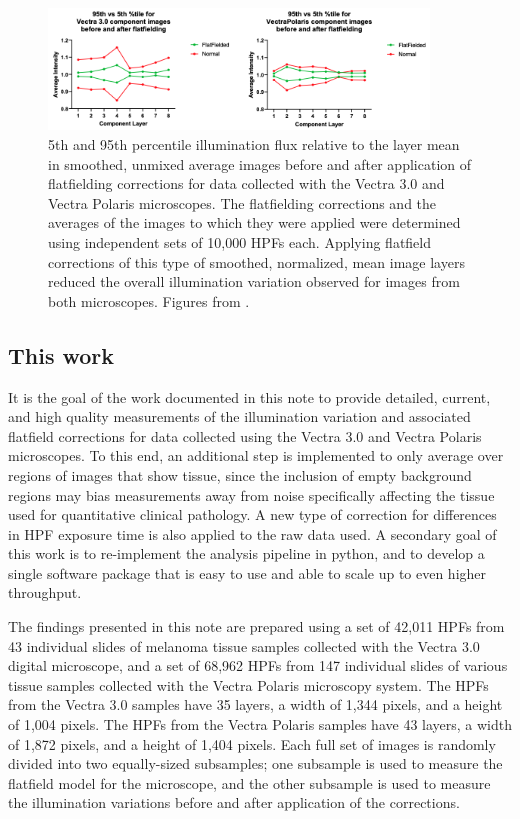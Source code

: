 \documentclass[letterpaper,11pt]{article}
\begin{document}
\begin{figure}[!ht]
\centering
\includegraphics[width=0.9\textwidth]{images/introduction/fourth_flatfield_impact}
\caption{\footnotesize 5th and 95th percentile illumination flux relative to the layer mean in smoothed, unmixed average images before and after application of flatfielding corrections for data collected with the Vectra 3.0 and Vectra Polaris microscopes. The flatfielding corrections and the averages of the images to which they were applied were determined using independent sets of 10,000 HPFs each. Applying flatfield corrections of this type of smoothed, normalized, mean image layers reduced the overall illumination variation observed for images from both microscopes. Figures from \cite{Ben_flatfielding_1}.}
\label{fig:fourth_flatfielding}
\end{figure}

\subsection{This work}
\label{ssec:this_work}

It is the goal of the work documented in this note to provide detailed, current, and high quality measurements of the illumination variation and associated flatfield corrections for data collected using the Vectra 3.0 and Vectra Polaris microscopes. To this end, an additional step is implemented to only average over regions of images that show tissue, since the inclusion of empty background regions may bias measurements away from noise specifically affecting the tissue used for quantitative clinical pathology. A new type of correction for differences in HPF exposure time is also applied to the raw data used. A secondary goal of this work is to re-implement the analysis pipeline in python, and to develop a single software package that is easy to use and able to scale up to even higher throughput.

The findings presented in this note are prepared using a set of 42,011 HPFs from 43 individual slides of melanoma tissue samples collected with the Vectra 3.0 digital microscope, and a set of 68,962 HPFs from 147 individual slides of various tissue samples collected with the Vectra Polaris microscopy system. The HPFs from the Vectra 3.0 samples have 35 layers, a width of 1,344 pixels, and a height of 1,004 pixels. The HPFs from the Vectra Polaris samples have 43 layers, a width of 1,872 pixels, and a height of 1,404 pixels. Each full set of images is randomly divided into two equally-sized subsamples; one subsample is used to measure the flatfield model for the microscope, and the other subsample is used to measure the illumination variations before and after application of the corrections.
\end{document}
